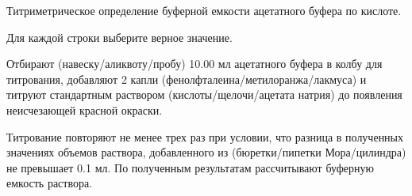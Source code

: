 
Титриметрическое
определение буферной емкости ацетатного буфера по кислоте.

Для каждой строки выберите верное значение.

Отбирают (навеску/аликвоту/пробу) 10.00 мл ацетатного буфера в колбу для титрования, добавляют 2 капли 
(фенолфталеина/метилоранжа/лакмуса) и титруют стандартным раствором (кислоты/щелочи/ацетата натрия) до появления неисчезающей красной окраски. 

Титрование повторяют не менее трех раз при условии, что разница в полученных значениях объемов раствора, добавленного из (бюретки/пипетки Мора/цилиндра) не превышает 0.1 мл. По полученным результатам рассчитывают буферную емкость раствора.

